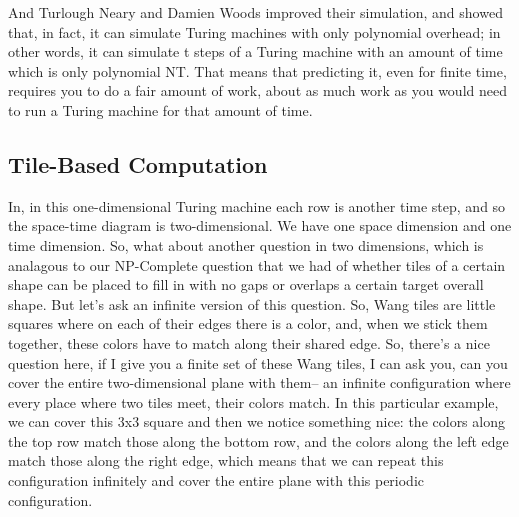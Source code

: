 \documentclass[]{article}
\begin{document}
And Turlough Neary and Damien Woods
improved their simulation,
and showed that, in fact, it can simulate
Turing machines with only
polynomial overhead; in other words,
it can simulate t steps
of a Turing machine
with an amount of time
which is only polynomial NT.
That means that predicting it,
even for finite time,
requires you to do a fair amount of work,
about as much work as you
would need to run a Turing machine
for that amount of time.

\subsection{Tile-Based Computation}

In, in this one-dimensional Turing machine
each row is another time step,
and so the space-time diagram
is two-dimensional.
We have one space dimension
and one time dimension.
So, what about another question
in two dimensions,
which is analagous
to our NP-Complete question
that we had of whether
tiles of a certain shape
can be placed
to fill in with no gaps or overlaps
a certain target overall shape.
But let's ask an infinite version
of this question.
So, Wang tiles
are little squares
where on each of their edges
there is a color,
and, when we stick them together,
these colors have to match
along their shared edge.
So, there's a nice question here,
if I give you
a finite set of these Wang tiles,
I can ask you,
can you cover the entire
two-dimensional plane with them--
an infinite configuration
where every place where two tiles meet,
their colors match.
In this particular example,
we can cover this 3x3 square
and then we notice something nice:
the colors along the top row
match those along the bottom row,
and the colors along the left edge
match those along the right edge,
which means that we can repeat
this configuration infinitely
and cover the entire plane
with this periodic configuration.
\end{document}
